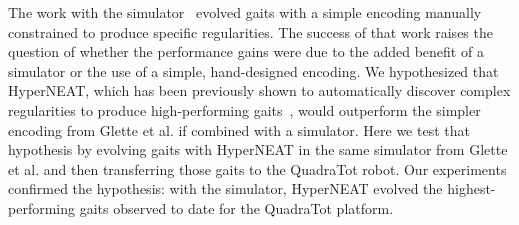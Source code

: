 The work with the simulator~\cite{glette} evolved gaits with a simple encoding manually constrained to produce specific regularities. The success of that work raises the question of whether the performance gains were due to the added benefit of a simulator or the use of a simple, hand-designed encoding. We hypothesized that HyperNEAT, which has been previously shown to automatically discover complex regularities to produce high-performing gaits~\cite{yos:clune,clune2011performance}, would outperform the simpler encoding from Glette et al. if combined with a simulator. 
Here we test that hypothesis by evolving gaits with HyperNEAT in the same simulator from Glette et al. and then transferring those gaits to the QuadraTot robot.  Our experiments confirmed the hypothesis: with the simulator, HyperNEAT evolved the highest-performing gaits observed to date for the QuadraTot platform. 




